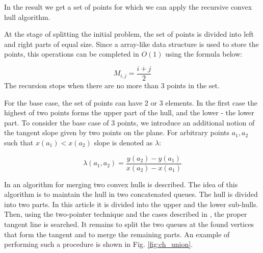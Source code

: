 \documentclass[a4paper,UKenglish,cleveref, autoref]{socg-lipics-v2019}
\begin{document}
	In the result we get a set of points for which we can apply the recursive convex hull algorithm.
	
	
	
	At the stage of splitting the initial problem, the set of points is divided into left and right parts of equal size. Since a array-like data structure is used to store the points, this operations can be completed in $O(1)$ using the formula below:
	
	\begin{equation}
		M_{i,j}=\frac{i+j}{2}
	\end{equation}
	The recursion stops when there are no more than $3$ points in the set.
	
	For the base case, the set of points can have $2$ or $3$ elements. In the first case the highest of two points forms the upper part of the hull, and the lower - the lower part. To consider the base case of $3$ points, we introduce an additional notion of the tangent slope given by two points on the plane. For arbitrary points $a_1, a_2$ such that $x(a_1)<x(a_2)$ slope is denoted as $\lambda$:
	
	\begin{equation}
	\lambda(a_1, a_2)=\frac{y(a_2)-y(a_1)}{x(a_2)-x(a_1)}
	\end{equation}


	
	In \cite{overmars} an algorithm for merging two convex hulls is described. The idea of this algorithm is to maintain the hull in two concatenated queues. The hull is divided into two parts. In this article it is divided into the upper and the lower sub-hulls. Then, using the two-pointer technique and the cases described in \cite{overmars}, the proper tangent line is searched. It remains to split the two queues at the found vertices that form the tangent and to merge the remaining parts. An example of performing such a procedure is shown in Fig. \ref{fig:ch_union}.
	
\end{document}
